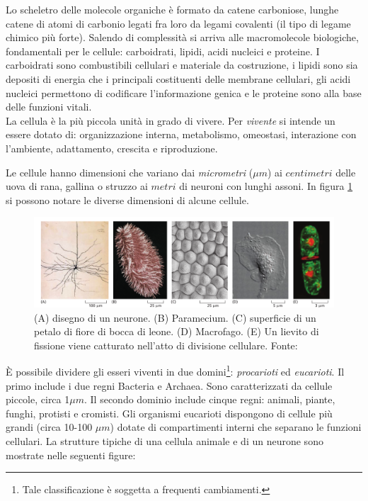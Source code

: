 \par Lo scheletro delle molecole organiche è formato da catene carboniose, lunghe catene di atomi di carbonio legati fra loro da legami covalenti (il tipo di legame chimico più forte). Salendo di complessità si arriva alle macromolecole biologiche, fondamentali per le cellule: carboidrati, lipidi, acidi nucleici e proteine. I carboidrati sono combustibili cellulari e materiale da costruzione, i lipidi sono sia depositi di energia che i principali costituenti delle membrane cellulari, gli acidi nucleici permettono di codificare l'informazione genica e le proteine sono alla base delle funzioni vitali.\\

La cellula è la più piccola unità in grado di vivere. Per \textit{vivente} si intende un essere dotato di: organizzazione interna, metabolismo, omeostasi, interazione con l'ambiente, adattamento, crescita e riproduzione.

\par Le cellule hanno dimensioni che variano dai \textit{micrometri} ($\mu m$) ai $centimetri$ delle uova di rana, gallina o struzzo ai $metri$ di neuroni con lunghi assoni. In figura \ref{fig:cellule-dimensioni} si possono notare le diverse dimensioni di alcune cellule.

\begin{figure}[!h]
	\centering
	\includegraphics[scale=0.5] {images/cellule-dimensioni.png}
	\caption{(A) disegno di un neurone. (B) Paramecium. (C) superficie di un petalo di fiore di bocca di leone. (D) Macrofago. (E) Un lievito di fissione viene catturato nell'atto di divisione cellulare. Fonte: \cite{alberts2018essential}}
	\label{fig:cellule-dimensioni}
\end{figure}

\par È possibile dividere gli esseri viventi in due domini\footnote{Tale classificazione è soggetta a frequenti cambiamenti.}: \textit{procarioti} ed \textit{eucarioti}. Il primo include i due regni Bacteria e Archaea. Sono caratterizzati da cellule piccole, circa 1$\mu m$. Il secondo dominio include cinque regni: animali, piante, funghi, protisti e cromisti. Gli organismi eucarioti dispongono di cellule più grandi (circa 10-100 $\mu m$) dotate di compartimenti interni che separano le funzioni cellulari. La strutture tipiche di una cellula animale e di un neurone sono mostrate nelle seguenti figure:

